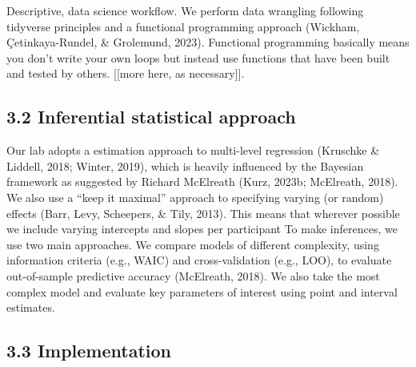 \documentclass[
  man, donotrepeattitle,floatsintext]{apa6}
\begin{document}
Descriptive, data science workflow.
We perform data wrangling following tidyverse principles and a functional programming approach (Wickham, Çetinkaya-Rundel, \& Grolemund, 2023).
Functional programming basically means you don't write your own loops but instead use functions that have been built and tested by others.
{[}{[}more here, as necessary{]}{]}.

\subsection{3.2 Inferential statistical approach}\label{inferential-statistical-approach}

Our lab adopts a estimation approach to multi-level regression (Kruschke \& Liddell, 2018; Winter, 2019), which is heavily influenced by the Bayesian framework as suggested by Richard McElreath (Kurz, 2023b; McElreath, 2018). We also use a ``keep it maximal'' approach to specifying varying (or random) effects (Barr, Levy, Scheepers, \& Tily, 2013). This means that wherever possible we include varying intercepts and slopes per participant
To make inferences, we use two main approaches. We compare models of different complexity, using information criteria (e.g., WAIC) and cross-validation (e.g., LOO), to evaluate out-of-sample predictive accuracy (McElreath, 2018). We also take the most complex model and evaluate key parameters of interest using point and interval estimates.

\subsection{3.3 Implementation}\label{implementation}
\end{document}
